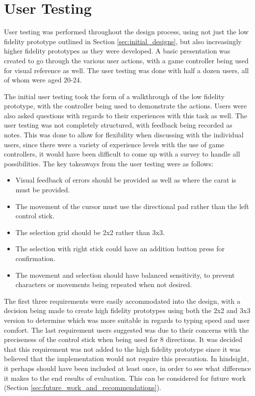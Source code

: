 \documentclass[testing.tex]{subfiles}
\begin{document}
\section{User Testing} %
\label{sec:user_testing}
User testing was performed throughout the design process, using not just the
low fidelity prototype outlined in Section \ref{sec:initial_designs}, but also
increasingly higher fidelity prototypes as they were developed. A basic
presentation was created to go through the various user actions, with a game
controller being used for visual reference as well. The user testing was done
with half a dozen users, all of whom were aged 20-24.

The initial user testing took the form of a walkthrough of the low fidelity
prototype, with the controller being used to demonstrate the actions. Users
were also asked questions with regards to their experiences with this task as
well. The user testing was not completely structured, with feedback being
recorded as notes. This was done to allow for flexibility when discussing with
the individual users, since there were a variety of experience levels with the
use of game controllers, it would have been difficult to come up with a survey
to handle all possibilities. The key takeaways from the user testing were as
follows:

\begin{itemize}
	\item Visual feedback of errors should be provided as well as where the
    carat is must be provided.
	\item The movement of the cursor must use the directional pad rather than
	the left control stick.
	\item The selection grid should be 2x2 rather than 3x3.
	\item The selection with right stick could have an addition button press for
	confirmation.
	\item The movement and selection should have balanced sensitivity, to
    prevent characters or movements being repeated when not desired.
\end{itemize}

The first three requirements were easily accommodated into the design, with a
decision being made to create high fidelity prototypes using both the 2x2 and
3x3 version to determine which was more suitable in regards to typing speed and
user comfort. The last requirement users suggested was due to their concerns
with the preciseness of the control stick when being used for 8 directions. It
was decided that this requirement was not added to the high fidelity prototype
since it was believed that the implementation would not require this precaution.
In hindsight, it perhaps should have been included at least once, in order to 
see what difference it makes to the end results of evaluation. This can be
considered for future work (Section \ref{sec:future_work_and_recommendations}).
\end{document}
